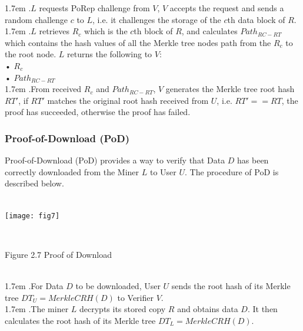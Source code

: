 \documentclass[10pt,a4paper]{article}
\begin{document}
\hangindent 1.7em
.\quad $L$ requests PoRep challenge from $V$, $V$ accepts the request and sends a random challenge $c$ to $L$, i.e. it challenges the storage of the $c$th data block of $R$.
\vspace{-0.8em}
\\

\hangindent 1.7em
.\quad $L$ retrieves $R_{c}$ which is the $c$th block of $R$, and calculates $Path_{RC-RT}$ which contains the hash values of all the Merkle tree nodes path from the $R_{c}$ to the root node. $L$ returns the following to $V$:
\\•   $R_{c}$\\ 
     •  $Path_{RC-RT}$
     \vspace{-0.5em}
\\

\hangindent 1.7em
.\quad From received $R_{c}$ and $Path_{RC-RT}$, $V$ generates the Merkle tree root hash $RT'$, if $RT'$ matches the original root hash received from $U$, i.e. $RT' == RT$, the proof has succeeded, otherwise the proof has failed.  
\vspace{-0.5em}
\subsubsection{Proof-of-Download (PoD)}  %
Proof-of-Download (PoD) provides a way to verify that Data $D$ has been correctly downloaded from the Miner $L$ to User $U$. The procedure of PoD is described below.
\vspace{-0.5em}
\\ \\
\centerline{\texttt{[image: fig7]}}
 \\ \centerline{{Figure 2.7 Proof of Download}}
 \vspace{-1.5em}
\\

\hangindent 1.7em
.\quad For Data $D$ to be downloaded, User $U$ sends the root hash of its Merkle tree $DT_{U}=MerkleCRH(D)$ to Verifier $V$.
\vspace{-0.8em}
\\

\hangindent 1.7em
.\quad The miner $L$ decrypts its stored copy $R$ and obtains data $D$. It then calculates the root hash of its Merkle tree $DT_{L}=MerkleCRH(D)$.
\vspace{-0.8em}
\\
\end{document}
